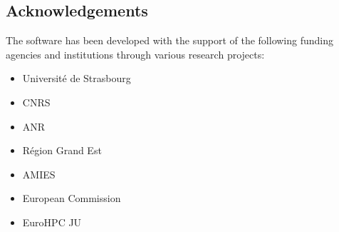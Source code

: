 \subsection{Acknowledgements}
\label{sec::Feelpp:acknowledgements}
The software has been developed with the support of the following funding agencies and institutions through various research projects:
\begin{itemize}
   \item Université de Strasbourg
   \item CNRS
   \item ANR
   \item Région Grand Est
   \item AMIES
   \item European Commission
   \item EuroHPC JU
\end{itemize}
